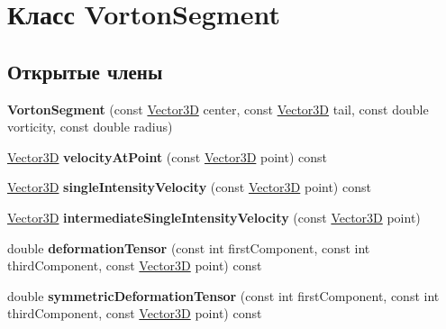 \hypertarget{class_vorton_segment}{}\section{Класс Vorton\+Segment}
\label{class_vorton_segment}
\subsection*{Открытые члены}
\begin{DoxyCompactItemize}
\item 
\mbox{\label{class_vorton_segment_a56634fb06ecc913c8f0f3597d6b29085}} 
{\bfseries Vorton\+Segment} (const \mbox{\hyperlink{class_vector3_d}{Vector3D}} center, const \mbox{\hyperlink{class_vector3_d}{Vector3D}} tail, const double vorticity, const double radius)
\item 
\mbox{\label{class_vorton_segment_a4a95116647bffdce3b5521a7763dffc8}} 
\mbox{\hyperlink{class_vector3_d}{Vector3D}} {\bfseries velocity\+At\+Point} (const \mbox{\hyperlink{class_vector3_d}{Vector3D}} point) const
\item 
\mbox{\label{class_vorton_segment_a1ac709fb04aa01fa05bb4e28399ad7bb}} 
\mbox{\hyperlink{class_vector3_d}{Vector3D}} {\bfseries single\+Intensity\+Velocity} (const \mbox{\hyperlink{class_vector3_d}{Vector3D}} point) const
\item 
\mbox{\label{class_vorton_segment_a676966cdda0400ddd88e26f4fb2ab546}} 
\mbox{\hyperlink{class_vector3_d}{Vector3D}} {\bfseries intermediate\+Single\+Intensity\+Velocity} (const \mbox{\hyperlink{class_vector3_d}{Vector3D}} point)
\item 
\mbox{\label{class_vorton_segment_a1be3bf4f23f0f5b907822be72bcd2cc8}} 
double {\bfseries deformation\+Tensor} (const int first\+Component, const int third\+Component, const \mbox{\hyperlink{class_vector3_d}{Vector3D}} point) const
\item 
\mbox{\label{class_vorton_segment_a427bbf74a0f6c963b13ffff5a9ce0770}} 
double {\bfseries symmetric\+Deformation\+Tensor} (const int first\+Component, const int third\+Component, const \mbox{\hyperlink{class_vector3_d}{Vector3D}} point) const

\end{DoxyCompactItemize}
